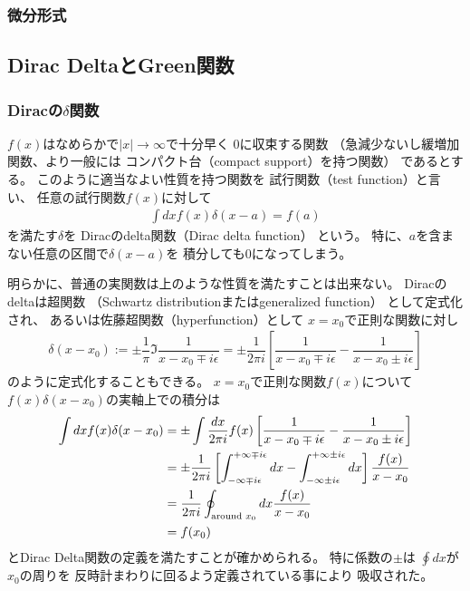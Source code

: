 \subsubsection{微分形式}

\newpage
\subsection{Dirac DeltaとGreen関数}

\subsubsection{Diracの$\delta$関数}

$f(x)$はなめらかで$|x| \to \infty$で十分早く
$0$に収束する関数
（急減少ないし緩増加関数、より一般には
コンパクト台（compact support）を持つ関数）
であるとする。
このように適当なよい性質を持つ関数を
試行関数（test function）と言い、
任意の試行関数$f(x)$に対して
\begin{align}
    \int dx f(x) \delta(x - a)
    =
    f(a)
\end{align}
を満たす$\delta$を
Diracのdelta関数（Dirac delta function）
という。
特に、$a$を含まない任意の区間で$\delta(x - a)$を
積分しても$0$になってしまう。

明らかに、普通の実関数は上のような性質を満たすことは出来ない。
Diracのdeltaは超関数
（Schwartz distributionまたはgeneralized function）
として定式化され、
あるいは佐藤超関数（hyperfunction）として
$x = x_0$で正則な関数に対し
\begin{align}
    \delta(x - x_0)
:=
    \pm
    \dfrac{1}{\pi}
    \Im
    \dfrac{1}{x - x_0 \mp i \epsilon}
=
    \pm
    \dfrac{1}{2 \pi i}
    \left[
        \dfrac{1}{x - x_0 \mp i \epsilon}
        -
        \dfrac{1}{x - x_0 \pm i \epsilon}
    \right]
\end{align}
のように定式化することもできる。
$x = x_0$で正則な関数$f(x)$について
$f(x) \delta(x - x_0)$の実軸上での積分は
\begin{align}
    \int dx
    f(x) \delta(x - x_0)
&=
    \pm
    \int
    \dfrac{dx}{2 \pi i}
    f(x)
    \left[
        \dfrac{1}{x - x_0 \mp i \epsilon}
        -
        \dfrac{1}{x - x_0 \pm i \epsilon}
    \right]
\notag\\&
=
    \pm
    \dfrac{1}{2 \pi i}
    \left[
    \int_{- \infty \mp i \epsilon}
        ^{+ \infty \mp i \epsilon}
        dx
    -
    \int_{- \infty \pm i \epsilon}
        ^{+ \infty \pm i \epsilon}
        dx
    \right]
    \dfrac{f(x)}{x - x_0}
\notag\\&
=
    \dfrac{1}{2 \pi i}
    \oint_{\text{around } x_0}
        dx
    \dfrac{f(x)}{x - x_0}
\notag\\&
=
    f(x_0)
\end{align}
とDirac Delta関数の定義を満たすことが確かめられる。
特に係数の$\pm$は
$\oint dx$が$x_0$の周りを
反時計まわりに回るよう定義されている事により
吸収された。

